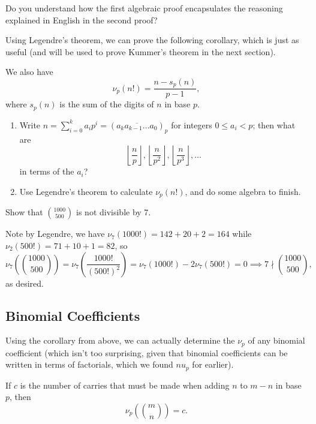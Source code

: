 \documentclass[mast]{lucky}
\begin{document}
\begin{remark}
    Do you understand how the first algebraic proof encapsulates the reasoning explained in English in the second proof?
\end{remark}

Using Legendre's theorem, we can prove the following corollary, which is just as useful (and will be used to prove Kummer's theorem in the next section).

\begin{corollary}
    We also have \[\nu_p(n!)=\frac{n-s_p(n)}{p-1},\] where $s_p(n)$ is the sum of the digits of $n$ in base $p$.
\end{corollary}

\begin{walk}
    \begin{enumerate}
        \item Write $n=\sum_{i=0}^k a_ip^i=\left( \overline{a_ka_{k-1}\dots a_0} \right)_p$ for integers $0\leq a_i<p$; then what are \[\left\lfloor \frac np \right\rfloor,\left\lfloor \frac n{p^2} \right\rfloor,\left\lfloor \frac n{p^3} \right\rfloor,\dots\] in terms of the $a_i$?
        \item Use Legendre's theorem to calculate $\nu_p(n!)$, and do some algebra to finish.
    \end{enumerate}
\end{walk}

\begin{exam}
    Show that $\binom{1000}{500}$ is not divisible by 7.
\end{exam}

\begin{sol}
    Note by Legendre, we have $\nu_7(1000!)=142+20+2=164$ while $\nu_2(500!)=71+10+1=82$, so \[\nu_7\left( \binom{1000}{500} \right)=\nu_7\left( \frac{1000!}{(500!)^2} \right)=\nu_7(1000!)-2\nu_7(500!)=0\implies 7\nmid \binom{1000}{500},\] as desired.
\end{sol}

\subsection{Binomial Coefficients}
Using the corollary from above, we can actually determine the $\nu_p$ of any binomial coefficient (which isn't too surprising, given that binomial coefficients can be written in terms of factorials, which we found $nu_p$ for earlier).

\begin{theo}[Kummer]
    If $c$ is the number of carries that must be made when adding $n$ to $m-n$ in base $p$, then \[\nu_p\left( \binom mn \right)=c.\]
\end{theo}
\end{document}
